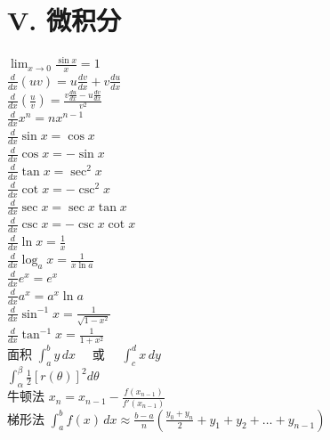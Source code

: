 \section*{V. 微积分}

\begin{minipage}[t]{0.5\textwidth}
$\lim_{x \to 0} \frac{\sin x}{x} = 1$ \\[8pt]
$\frac{d}{dx}(uv) = u\frac{dv}{dx} + v\frac{du}{dx}$ \\[8pt]
$\frac{d}{dx}\left(\frac{u}{v}\right) = \frac{v\frac{du}{dx} - u\frac{dv}{dx}}{v^{2}}$ \\[8pt]
$\frac{d}{dx}x^{n} = nx^{n-1}$ \\[8pt]
$\frac{d}{dx}\sin x = \cos x$ \\[8pt]
$\frac{d}{dx}\cos x = -\sin x$ \\[8pt]
$\frac{d}{dx}\tan x = \sec^{2}x$ \\[8pt]
$\frac{d}{dx}\cot x = -\csc^{2}x$ \\[8pt]
$\frac{d}{dx}\sec x = \sec x \tan x$ \\[8pt]
$\frac{d}{dx}\csc x = -\csc x \cot x$ \\[8pt]
$\frac{d}{dx}\ln x = \frac{1}{x}$ \\[8pt]
$\frac{d}{dx}\log_{a}x = \frac{1}{x \ln a}$ \\[8pt]
$\frac{d}{dx}e^{x} = e^{x}$ \\[8pt]
$\frac{d}{dx}a^{x} = a^{x} \ln a$ \\[8pt]
$\frac{d}{dx}\sin^{-1}x = \frac{1}{\sqrt{1-x^{2}}}$ \\[8pt]
$\frac{d}{dx}\tan^{-1}x = \frac{1}{1+x^{2}}$ \\[15pt]
面积 \quad $\int_{a}^{b} y \, dx \quad$ 或 $\quad \int_{c}^{d} x \, dy$ \\
\phantom{面积} \quad $\int_{\alpha}^{\beta} \frac{1}{2} [r(\theta)]^{2} d\theta$ \\[15pt]
牛顿法 \quad $x_{n} = x_{n-1} - \frac{f(x_{n-1})}{f'(x_{n-1})}$ \\[15pt]
梯形法 \quad $\int_{a}^{b} f(x) \, dx \approx \frac{b-a}{n} \left( \frac{y_{0}+y_{n}}{2} + y_{1} + y_{2} + \dots + y_{n-1} \right)$
\end{minipage}

